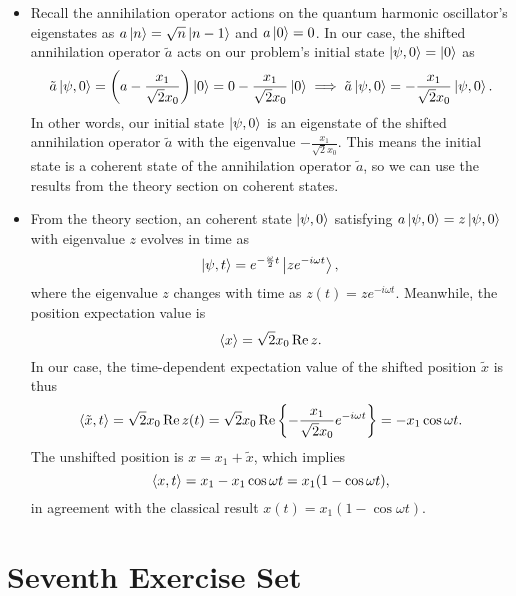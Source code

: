 \documentclass[11pt, a4paper]{article}
\begin{document}
\begin{itemize}
 	\item Recall the annihilation operator actions on the quantum harmonic oscillator's eigenstates as $ a \ket{n} = \sqrt{n} \ket{n-1} $ and $ a \ket{0} = 0 $. In our case, the shifted annihilation operator $ \tilde{a} $ acts on our problem's initial state $ \ket{\psi, 0} = \ket{0} $ as
 	\begin{equation*}
 		\tilde{a}\ket{\psi, 0} = \left(a -\frac{x_{1}}{\sqrt{2}x_{0}}\right)\ket{0} = 0 - \frac{x_{1}}{\sqrt{2}x_{0}} \ket{0} \implies \tilde{a}\ket{\psi, 0} = - \frac{x_{1}}{\sqrt{2}x_{0}} \ket{\psi, 0}.
 	\end{equation*}
 	In other words, our initial state $ \ket{\psi, 0} $ is an eigenstate of the shifted annihilation operator $ \tilde{a} $ with the eigenvalue $  - \frac{x_{1}}{\sqrt{2}x_{0}} $. This means the initial state is a coherent state of the annihilation operator $ \tilde{a} $, so we can use the results from the theory section on coherent states.
 	
 	\item From the theory section, an coherent state $ \ket{\psi, 0} $ satisfying $ a \ket{\psi, 0} = z \ket{\psi, 0} $ with eigenvalue $ z $ evolves in time as
 	\begin{equation*}
		\ket{\psi, t} = e^{-\frac{\omega}{2}t}\ket{ze^{-i\omega t}},
 	\end{equation*}
	where the eigenvalue $ z $ changes with time as $ 	z(t) = ze^{-i\omega t} $. Meanwhile, the position expectation value is
	\begin{equation*}
		\ev{x} = \sqrt{2} x_{0}\Re z.
	\end{equation*}
	In our case, the time-dependent expectation value of the shifted position $ \tilde{x} $ is thus
	\begin{equation*}
		\ev{\tilde{x}, t} = \sqrt{2}x_{0}\Re z(t) = \sqrt{2}x_{0}\Re \left\{- \frac{x_{1}}{\sqrt{2}x_{0}}e^{-i\omega t}\right\} = - x_{1} \cos \omega t.
	\end{equation*}
	The unshifted position is $ x = x_{1} + \tilde{x} $, which implies
	\begin{equation*}
		\ev{x, t} = x_{1} - x_{1}\cos \omega t = x_{1}(1 - \cos \omega t),
	\end{equation*}
	in agreement with the classical result $ x(t) = x_{1}(1 - \cos \omega t) $. 
\end{itemize}


\section{Seventh Exercise Set}
\end{document}
